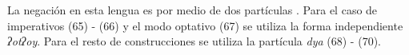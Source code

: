 La negación en esta lengua es por medio de dos partículas \textcolor{MidnightBlue}{\citep{Popoluca}}. Para el caso de imperativos (65) - (66) y el modo optativo (67) se utiliza la forma independiente {\setmainfont{Charis SIL} \textit{ʔotʔoy}}. Para el resto de construcciones se utiliza la partícula {\setmainfont{Charis SIL} \textit{dya}} (68) - (70).